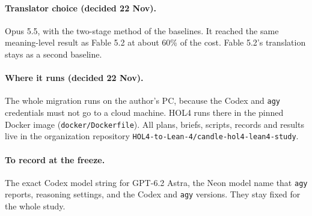 \documentclass[11pt,a4paper]{article}
\newcommand{\code}[1]{\texttt{#1}}
\begin{document}
\paragraph{Translator choice (decided 22 Nov).} Opus 5.5, with the two-stage method of the baselines. It reached the same meaning-level result as Fable 5.2 at about 60\% of the cost. Fable 5.2's translation stays as a second baseline.

\paragraph{Where it runs (decided 22 Nov).} The whole migration runs on the author's PC, because the Codex and \code{agy} credentials must not go to a cloud machine. HOL4 runs there in the pinned Docker image (\code{docker/Dockerfile}). All plans, briefs, scripts, records and results live in the organization repository \code{HOL4-to-Lean-4/candle-hol4-lean4-study}.

\paragraph{To record at the freeze.} The exact Codex model string for GPT-6.2 Astra, the Neon model name that \code{agy} reports, reasoning settings, and the Codex and \code{agy} versions. They stay fixed for the whole study.
\end{document}
